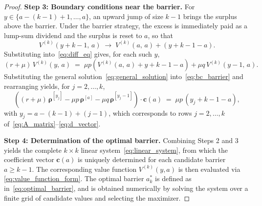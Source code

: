 \begin{proof}
\medskip
\noindent\textbf{Step 3: Boundary conditions near the barrier.}
For $y \in \{a-(k-1)+1, \dots, a\}$, an upward jump of size $k-1$ brings the
surplus above the barrier. Under the barrier strategy, the excess is immediately
paid as a lump-sum dividend and the surplus is reset to $a$, so that
\begin{equation*}
    V^{(k)}(y + k - 1,\, a)
    \;\longrightarrow\;
    V^{(k)}(a,\, a) + (y + k - 1 - a).
\end{equation*}
Substituting into~\eqref{eq:diff_eq} gives, for each such $y$,
\begin{equation}\label{eq:bc_barrier}
    (r+\mu)\,V^{(k)}(y,\,a)
    \;=\;
    \mu p\!\left(V^{(k)}(a,\,a) + y + k - 1 - a\right)
    + \mu q\,V^{(k)}(y-1,\,a).
\end{equation}
Substituting the general solution~\eqref{eq:general_solution}
into~\eqref{eq:bc_barrier} and rearranging yields, for $j = 2, \dots, k$,
\begin{equation*}
    \left(
        (r+\mu)\,\bm{\rho}^{[y_j]}
        - \mu p\,\bm{\rho}^{[a]}
        - \mu q\,\bm{\rho}^{[y_j-1]}
    \right) \cdot \mathbf{c}(a)
    \;=\;
    \mu p\,(y_j + k - 1 - a),
\end{equation*}
with $y_j = a-(k-1)+(j-1)$, which corresponds to rows $j = 2, \dots, k$
of~\eqref{eq:A_matrix}--\eqref{eq:d_vector}.

\medskip
\noindent\textbf{Step 4: Determination of the optimal barrier.}
Combining Steps 2 and 3 yields the complete $k \times k$ linear
system~\eqref{eq:linear_system}, from which the coefficient vector $\mathbf{c}(a)$
is uniquely determined for each candidate barrier $a \geq k-1$.
The corresponding value function $V^{(k)}(y, a)$ is then evaluated via
\eqref{eq:value_function_form}. The optimal barrier $a_k^*$ is defined
as in~\eqref{eq:optimal_barrier}, and is obtained numerically by solving
the system over a finite grid of candidate values and selecting the maximizer.
\end{proof}

